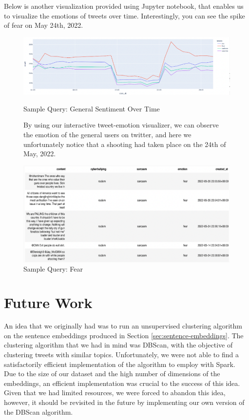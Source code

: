 \documentclass[a4paper,12pt]{article}
\begin{document}
Below is another visualization provided using Jupyter notebook, that enables us to visualize the emotions of tweets over time.
Interestingly, you can see the spike of fear on May 24th, 2022.

\begin{figure}[h]
{\centering
	\includegraphics[width=\textwidth]{graph.png}
	\caption{Sample Query: General Sentiment Over Time}
	\label{fig:Emotion-Time-Query}
}
	\vspace{5mm} %
By using our interactive tweet-emotion visualizer, we can
observe the emotion of the general users on twitter, and here we unfortunately notice that a shooting had taken place
on the 24th of May, 2022.
	{
	\centering
	\includegraphics[width=\textwidth]{graphTweets.png}
	\caption{Sample Query: Fear}
	\label{fig:Fear-Query}
}
\end{figure}

\section{Future Work}
An idea that we originally had was to run an unsupervised clustering algorithm on the sentence embeddings produced in Section \ref{sec:sentence-embeddings}. The clustering algorithm that we had in mind was DBScan\cite{Ester96adensity-based}, with the objective of clustering tweets with similar topics. Unfortunately, we were not able to find a satisfactorily efficient implementation of the algorithm to employ with Spark. Due to the size of our dataset and the high number of dimensions of the embeddings, an efficient implementation was crucial to the success of this idea. Given that we had limited resources, we were forced to abandon this idea, however, it should be revisited in the future by implementing our own version of the DBScan algorithm.
\end{document}
